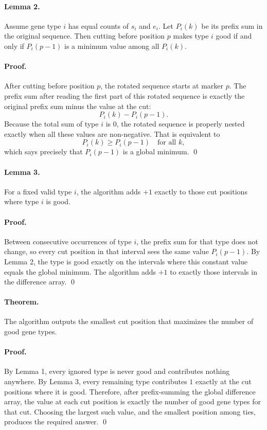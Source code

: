 \documentclass[11pt]{article}
\begin{document}
\paragraph{Lemma 2.}
Assume gene type $i$ has equal counts of $s_i$ and $e_i$. Let $P_i(k)$ be its prefix sum in the original sequence. Then cutting before position $p$ makes type $i$ good if and only if $P_i(p-1)$ is a minimum value among all $P_i(k)$.

\paragraph{Proof.}
After cutting before position $p$, the rotated sequence starts at marker $p$. The prefix sum after reading the first part of this rotated sequence is exactly the original prefix sum minus the value at the cut:
\[
P_i(k) - P_i(p-1).
\]
Because the total sum of type $i$ is $0$, the rotated sequence is properly nested exactly when all these values are non-negative. That is equivalent to
\[
P_i(k) \ge P_i(p-1)
\quad \text{for all } k,
\]
which says precisely that $P_i(p-1)$ is a global minimum. \qed

\paragraph{Lemma 3.}
For a fixed valid type $i$, the algorithm adds $+1$ exactly to those cut positions where type $i$ is good.

\paragraph{Proof.}
Between consecutive occurrences of type $i$, the prefix sum for that type does not change, so every cut position in that interval sees the same value $P_i(p-1)$. By Lemma 2, the type is good exactly on the intervals where this constant value equals the global minimum. The algorithm adds $+1$ to exactly those intervals in the difference array. \qed

\paragraph{Theorem.}
The algorithm outputs the smallest cut position that maximizes the number of good gene types.

\paragraph{Proof.}
By Lemma 1, every ignored type is never good and contributes nothing anywhere. By Lemma 3, every remaining type contributes $1$ exactly at the cut positions where it is good. Therefore, after prefix-summing the global difference array, the value at each cut position is exactly the number of good gene types for that cut. Choosing the largest such value, and the smallest position among ties, produces the required answer. \qed
\end{document}
